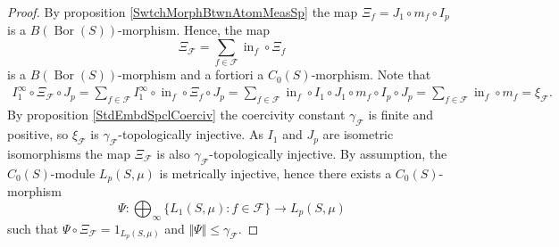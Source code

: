 \documentclass[12pt]{article}
\begin{document}
\begin{proof}
    By proposition \ref{SwtchMorphBtwnAtomMeasSp} the 
    map $\Xi_f=J_1\circ m_f\circ I_p$ is 
    a $B(\operatorname{Bor}(S))$-morphism. Hence, the map 
    \[
        \Xi_{\mathcal{F}}=\sum_{f\in\mathcal{F}}\operatorname{in}_f\circ \Xi_f
    \]
    is a $B(\operatorname{Bor}(S))$-morphism and a fortiori a $C_0(S)$-morphism. 
    Note that
    \[
    \begin{aligned}
        I_1^\infty\circ\Xi_\mathcal{F}\circ J_p
        = \sum_{f\in\mathcal{F}} 
            I_1^\infty\circ\operatorname{in}_f \circ \Xi_f \circ J_p
        = \sum_{f\in\mathcal{F}} 
            \operatorname{in}_f\circ I_1 \circ 
            J_1 \circ m_f \circ I_p \circ J_p
        =\sum_{f\in\mathcal{F}} \operatorname{in}_f\circ m_f 
        =\xi_{\mathcal{F}}.
    \end{aligned}
    \]
    By proposition \ref{StdEmbdSpclCoerciv} the coercivity 
    constant $\gamma_{\mathcal{F}}$ is finite and positive, 
    so $\xi_{\mathcal{F}}$ is $\gamma_{\mathcal{F}}$-topologically injective.
    As $I_1$ and $J_p$ are isometric isomorphisms the map $\Xi_{\mathcal{F}}$ is
    also $\gamma_{\mathcal{F}}$-topologically injective. By assumption, 
    the $C_0(S)$-module $L_p(S,\mu)$ is metrically injective, hence there 
    exists a $C_0(S)$-morphism 
    \[
        \Psi:
        \bigoplus_{\infty}\{ L_1(S,\mu):f\in\mathcal{F}\}\to L_p(S,\mu)
    \]
    such that $\Psi\circ \Xi_{\mathcal{F}}=1_{L_p(S,\mu)}$ 
    and $\Vert \Psi\Vert\leq \gamma_{\mathcal{F}}$.


\end{proof}
\end{document}
